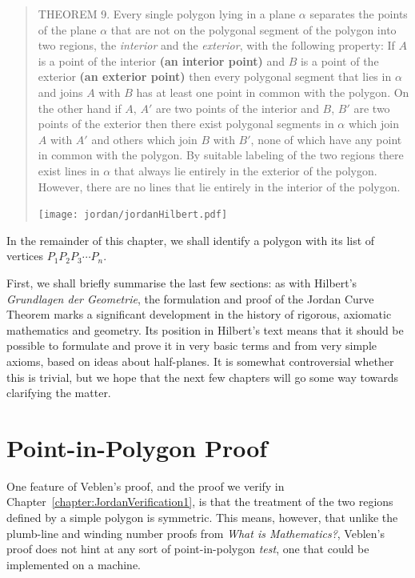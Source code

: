 \begin{quote}
  THEOREM 9. Every single polygon lying in a plane $\alpha$ separates the points of the plane $\alpha$ that are not on the polygonal segment of the polygon into two regions, the \emph{interior} and the \emph{exterior}, with the following property: If $A$ is a point of the interior {\bfseries (an interior point)} and $B$ is a point of the exterior {\bfseries (an exterior point)} then every polygonal segment that lies in $\alpha$ and joins $A$ with $B$ has at least one point in common with the polygon. On the other hand if $A$, $A'$ are two points of the interior and $B$, $B'$ are two points of the exterior then there exist polygonal segments in $\alpha$ which join $A$ with $A'$ and others which join $B$ with $B'$, none of which have any point in common with the polygon. By suitable labeling of the two regions there exist lines in $\alpha$ that always lie entirely in the exterior of the polygon. However, there are no lines that lie entirely in the interior of the polygon.

  \centering\texttt{[image: jordan/jordanHilbert.pdf]}
\end{quote}

In the remainder of this chapter, we shall identify a polygon with its list of vertices $P_1P_2P_3\cdots P_n$.

First, we shall briefly summarise the last few sections: as with Hilbert's \emph{Grundlagen der Geometrie}, the formulation and proof of the Jordan Curve Theorem marks a significant development in the history of rigorous, axiomatic mathematics and geometry. Its position in Hilbert's text means that it should be possible to formulate and prove it in very basic terms and from very simple axioms, based on ideas about half-planes. It is somewhat controversial whether this is trivial, but we hope that the next few chapters will go some way towards clarifying the matter.

\section{Point-in-Polygon Proof}\label{sec:JordanCurveFirstProof}
One feature of Veblen's proof, and the proof we verify in Chapter~\ref{chapter:JordanVerification1}, is that the treatment of the two regions defined by a simple polygon is symmetric. This means, however, that unlike the plumb-line and winding number proofs from \emph{What is Mathematics?}, Veblen's proof does not hint at any sort of point-in-polygon \emph{test}, one that could be implemented on a machine.

